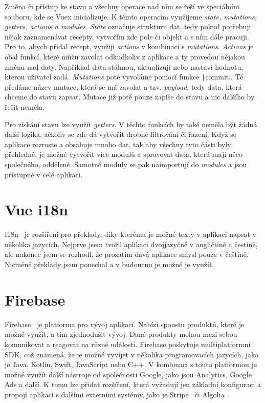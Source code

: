 Změna či přístup ke stavu a všechny operace nad ním se řeší ve speciálním souboru, kde se Vuex inicializuje. K těmto operacím využijeme \emph{state, mutations, getters, actions a modules}.
\emph{State} označuje strukturu dat, tedy pokud potřebuji nějak zaznamenávat recepty, vytvořím zde pole či objekt a s ním dále pracuji. Pro to, abych přidal recept, využiji \emph{actions} v kombinaci s
\emph{mutations}. \emph{Actions} je obal funkcí, které můžu zavolat odkudkoliv z aplikace a ty provedou nějakou změnu nad daty. Například data stáhnou, aktualizují nebo nastaví hodnotu, kterou uživatel
zadá. \emph{Mutations} poté vyvoláme pomocí funkce \texttt|commit|. Té předáme název mutace, která se má zavolat a tzv. \emph{payload}, tedy data, která chceme do stavu zapsat. Mutace již poté pouze zapíše
do stavu a nic dalšího by řešit neměla.

Pro získání stavu lze využít \emph{getters}. V těchto funkcích by také neměla být žádná další logika, ačkoliv se zde dá vytvořit drobné filtrování či řazení.
Když se aplikace rozroste a obsahuje mnoho dat, tak aby všechny tyto části byly přehledné, je možné vytvořit více modulů a spravovat data, která mají něco společného,
odděleně. Samotné moduly se pak naimportují do \emph{modules} a jsou přístupné v celé aplikaci.

\section{Vue i18n}
I18n~\cite{i18n} je rozšíření pro překlady, díky kterému je možné texty v aplikaci napsat v několika jazycích. Nejprve jsem tvořil aplikaci dvojjazyčně
v angličtině a čestině, ale nakonec jsem se rozhodl, že prozatím dává aplikace smysl pouze v češtině. Nicméně překlady jsem ponechal a v budoucnu
je možné je využít.

\section{Firebase}
Firebase~\cite{Firebase} je platforma pro vývoj aplikací. Nabízí spoustu produktů, které je možné využít, a tím zjednodušit vývoj.
Dané produkty mohou mezi sebou komunikovat a reagovat na různé události. Firebase poskytuje multiplatformní SDK, což znamená, že je
možné vyvíjet v několika programovacích jazycích, jako je Java, Kotlin, Swift, JavaScript nebo C++. V kombinaci s touto platformou je možné
využít další nástroje od společnosti Google, jako jsou Analytics, Google Ads a další. K tomu lze přidat rozšíření, která vyžadují jen základní
konfiguraci a propojí aplikaci s dalšími externími systémy, jako je Stripe~\cite{Stripe} či Algolia~\cite{Algolia}.


